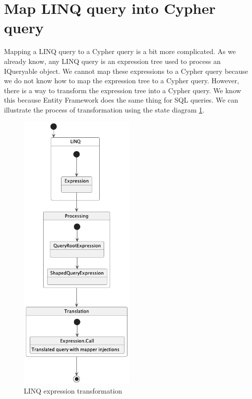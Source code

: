 \section {Map LINQ query into Cypher query}

Mapping a LINQ query to a Cypher query is a bit more complicated. As we already know, any LINQ query is an expression tree used to process an IQueryable object.
We cannot map these expressions to a Cypher query because we do not know how to map the expression tree to a Cypher query. However, there is a way to transform the expression tree
into a Cypher query. We know this because Entity Framework does the same thing for SQL queries. We can illustrate the process of transformation using the state diagram
\ref{fig:querystate}.

\begin{figure}[H]
    \centering
    \includegraphics[width=0.5\textwidth]{content/Expression transformation.png}
    \caption{LINQ expression transformation}
    \label{fig:querystate}
\end{figure}

